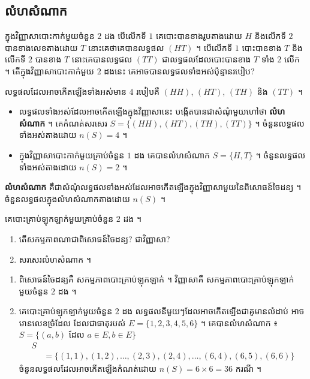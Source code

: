 \subsection{លំហសំណាក}

\begin{example}[ឧទាហរណ៍]
ក្នុងវិញ្ញាសាបោះកាក់មួយចំនួន $2$ ដង បើលើកទី $1$ គេបោះបានខាងរូបតាងដោយ $H$ និងលើកទី $2$ បានខាងលេខតាងដោយ $T$ នោះគេថាគេបានលទ្ធផល $(HT)$ ។ បើលើកទី $1$ បោះបានខាង $T$ និងលើកទី $2$ បានខាង $T$ នោះគេបានលទ្ធផល $(TT)$ ជាលទ្ធផលដែលបោះបានខាង $T$ ទាំង $2$ លើក ។ តើក្នុងវិញ្ញាសាបោះកាក់មួយ $2$ ដងនេះ គេអាចបានលទ្ធផលទាំងអស់ប៉ុន្មានរបៀប?
\end{example}
លទ្ធផលដែលអាចកើតឡើងទាំងអស់មាន $4$ របៀបគឺ $(HH)$, $(HT)$, $(TH)$ និង $(TT)$ ។
\begin{itemize}
  \item លទ្ធផលទាំងអស់ដែលអាចកើតឡើងក្នុងវិញ្ញាសានេះ បង្កើតបានជាសំណុំមួយហៅថា \textbf{លំហសំណាក} ។ គេកំណត់សរសេរ $S = \{(HH), (HT), (TH), (TT)\}$ ។ ចំនួនលទ្ធផលទាំងអស់តាងដោយ $n(S) = 4$ ។
  \item ក្នុងវិញ្ញាសាបោះកាក់មួយគ្រាប់ចំនួន $1$ ដង គេបានលំហសំណាក $S = \{H, T\}$ ។ ចំនួនលទ្ធផលទាំងអស់តាងដោយ $n(S) = 2$ ។
\end{itemize}

\begin{definition}[និយមន័យ]
\textbf{លំហសំណាក} គឺជាសំណុំលទ្ធផលទាំងអស់ដែលអាចកើតឡើងក្នុងវិញ្ញាសាមួយនៃពិសោធន៍ចៃដន្យ ។ ចំនួនលទ្ធផលក្នុងលំហសំណាកតាងដោយ $n(S)$ ។
\end{definition}

\begin{example}[លំហាត់គំរូ]
គេបោះគ្រាប់ឡុកឡាក់មួយគ្រាប់ចំនួន $2$ ដង ។
\begin{enumerate}[a]
  \item តើសកម្មភាពណាជាពិសោធន៍ចៃដន្យ? ជាវិញ្ញាសា?
  \item សរសេរលំហសំណាក ។
\end{enumerate}
\ans
\begin{enumerate}[a]
  \item ពិសោធន៍ចៃដន្យគឺ សកម្មភាពបោះគ្រាប់ឡុកឡាក់ ។ វិញ្ញាសាគឺ សកម្មភាពបោះគ្រាប់ឡុកឡាក់មួយចំនួន $2$ ដង ។
  \item គេបោះគ្រាប់ឡុកឡាក់មួយចំនួន $2$ ដង លទ្ធផលនីមួយៗដែលអាចកើតឡើងជាគូមានលំដាប់ អាចមានលេខច្រំដែល ដែលជាធាតុរបស់ $E = \{1, 2, 3, 4, 5, 6\}$ ។ គេបានលំហសំណាក ៖ $S = \{(a, b)$ ដែល $a \in E, b \in E\}$
  \[
\begin{aligned}
S &\\
&= \{(1, 1), (1, 2), \dots, (2, 3), (2, 4), \dots, (6, 4), (6, 5), (6, 6)\}
\end{aligned}
\]
  ចំនួនលទ្ធផលដែលអាចកើតឡើងកំណត់ដោយ $n(S) = 6\times 6 = 36$ ករណី ។
\end{enumerate}
\end{example}

